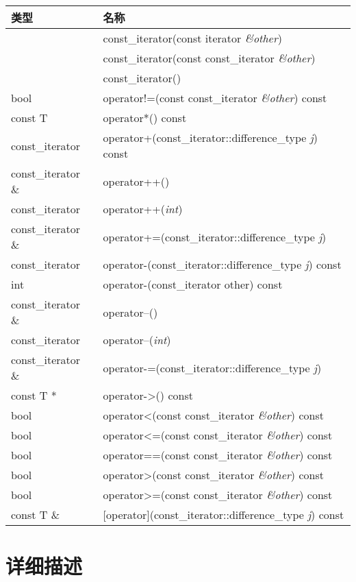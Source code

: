 \begin{longtable}{|l|l|}
\hline
类型 &	名称\\
\hline
    &const\_iterator(const iterator \emph{\&other})\\
\hline
	&const\_iterator(const const\_iterator \emph{\&other})\\
\hline
	&const\_iterator()\\
\hline
bool &	operator!=(const const\_iterator \emph{\&other}) const\\
\hline
const T & 	operator*() const\\
\hline
const\_iterator &	operator+(const\_iterator::difference\_type \emph{j})
                  const\\
\hline
const\_iterator \& &	operator++()\\
\hline
const\_iterator &	operator++(\emph{int})\\
\hline
const\_iterator \& & 	operator+=(const\_iterator::difference\_type
                     \emph{j})\\
\hline
const\_iterator &	operator-(const\_iterator::difference\_type \emph{j})
                  const\\
\hline
int 	&operator-(const\_iterator other) const\\
\hline
const\_iterator \& &	operator--()\\
\hline
const\_iterator 	& operator--(\emph{int})\\
\hline
const\_iterator \& 	& operator-=(const\_iterator::difference\_type \emph{j})\\
const T * &	operator->() const\\
\hline
bool& 	operator<(const const\_iterator \emph{\&other}) const\\
\hline
bool& 	operator<=(const const\_iterator \emph{\&other}) const\\
\hline
bool& 	operator==(const const\_iterator \emph{\&other}) const\\
\hline
bool& 	operator>(const const\_iterator \emph{\&other}) const\\
\hline
bool& 	operator>=(const const\_iterator \emph{\&other}) const\\
\hline
const T \& &	[operator](const\_iterator::difference\_type \emph{j}) const\\
\hline
\end{longtable}


\section{详细描述}

